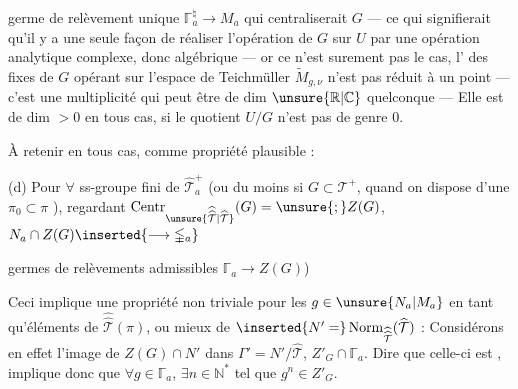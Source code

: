 germe de relèvement unique $\mathbb{\Gamma}_a^{\natural}\longrightarrow M_a$ qui centraliserait $G$ --- ce qui signifierait qu'il y a  une seule façon de réaliser l'opération  de $G$ sur $U$ par une opération  analytique complexe, donc algébrique --- or ce n'est surement pas le cas, l' des  fixes de $G$ opérant sur l'espace de Teichmüller $\widetilde M_{g,\nu}$ n'est pas réduit à un point --- c'est  une multiplicité  qui peut être  de dim $\unsure{\mathbb R|\mathbb C}$ quelconque --- Elle est de dim $>0$ en tous cas, si le quotient  $U/G$ n'est pas de genre $0$.

À retenir en tous cas, comme propriété plausible :

(d) Pour $\forall$ ss-groupe fini  de $\widehat{\mathcal T}_a^+$ (ou du moins si $G\subset\mathcal T^+$, quand on dispose d'une  $\pi_0\subset\pi$ ), regardant $\operatorname{Centr}_{\unsure{\widehat{\widehat{\mathcal T}}|\widehat{\mathcal T}}}(G)=\unsure{;}Z(G)$, $N_a\cap Z(G)\inserted{\longrightarrow\mathbb{\Gamma}_a}$  

germes de relèvements admissibles $\mathbb{\Gamma}_a\to Z(G)$)

Ceci implique une propriété non triviale pour
les $g\in\unsure{N_a|M_a}$  en tant qu'éléments de $\widehat{\widehat{\mathcal T}}(\pi)$,
ou mieux de $\inserted{N'=}\operatorname{Norm}_{\widehat{\widehat{\mathcal T}}}(\widehat{\mathcal T})$ :
Considérons en effet l'image  de
$Z(G)\cap N'$ dans $\Gamma'=N'/\widehat{\mathcal T}$, 
$Z'_G\cap\mathbb{\Gamma}_a$. Dire que celle-ci est  ,
implique donc que $\forall g\in\mathbb{\Gamma}_a$,  $\exists n\in\mathbb N^{*}$
tel que $g^n\in Z'_G$. 

